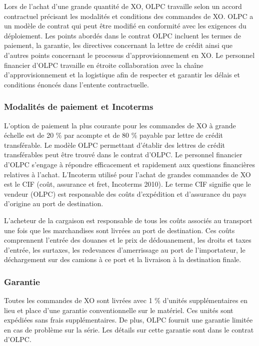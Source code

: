 \documentclass[12pt]{article}
\begin{document}
Lors de l'achat d'une grande quantité de XO, OLPC travaille selon un accord
contractuel précisant les modalités et conditions des commandes de XO. OLPC
a un modèle de contrat qui peut être modifié en conformité avec les
exigences du déploiement. Les points abordés dans le contrat OLPC incluent
les termes de paiement, la garantie, les directives concernant la lettre de
crédit ainsi que d'autres points concernant le processus
d'approvisionnement en XO.  Le personnel financier d'OLPC travaille en
étroite collaboration avec la chaîne d'approvisionnement et la logistique
afin de respecter et garantir les délais et conditions énoncés dans
l'entente contractuelle.
\subsubsection{Modalités de paiement et Incoterms}
\label{sec-8-2-1}



L'option de paiement la plus courante pour les commandes de XO à grande
échelle est de 20 \% par acompte et de 80 \% payable par lettre de crédit
transférable. Le modèle OLPC permettant d'établir des lettres de crédit
transférables peut être trouvé dans le contrat d'OLPC. Le personnel
financier d'OLPC s'engage à répondre efficacement et rapidement aux
questions financières relatives à l'achat. L'Incoterm utilisé pour l'achat
de grandes commandes de XO est le CIF (coût, assurance et fret, Incoterms
2010). Le terme CIF signifie que le vendeur (OLPC) est responsable des
coûts d'expédition et d'assurance du pays d'origine au port de
destination.

L'acheteur de la cargaison est responsable de tous les coûts associés au
transport une fois que les marchandises sont livrées au port de
destination. Ces coûts comprennent l'entrée des douanes et le prix de
dédouanement, les droits et taxes d'entrée, les surtaxes, les redevances
d'amerrissage au port de l'importateur, le déchargement sur des camions à
ce port et la livraison à la destination finale.
\subsubsection{Garantie}
\label{sec-8-2-2}



Toutes les commandes de XO sont livrées avec 1 \% d'unités supplémentaires
en lieu et place d'une garantie conventionnelle sur le matériel. Ces unités
sont expédiées sans frais supplémentaires. De plus, OLPC fournit une
garantie limitée en cas de problème sur la série. Les détails sur cette
garantie sont dans le contrat d'OLPC.
\end{document}
